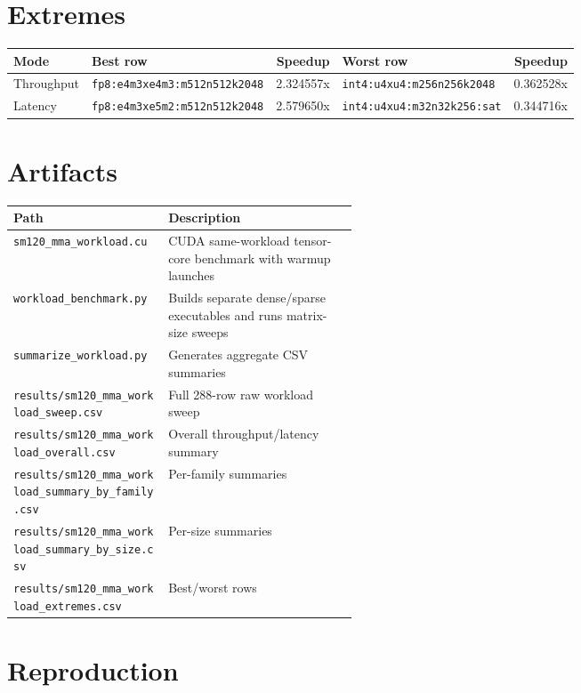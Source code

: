 \documentclass[10pt]{article}
\begin{document}
\section{Extremes}

\begin{center}
\small
\begin{tabularx}{\linewidth}{lY r Y r}
\toprule
Mode & Best row & Speedup & Worst row & Speedup \\
\midrule
Throughput & \texttt{fp8:e4m3xe4m3:m512n512k2048} & 2.324557x & \texttt{int4:u4xu4:m256n256k2048} & 0.362528x \\
Latency & \texttt{fp8:e4m3xe5m2:m512n512k2048} & 2.579650x & \texttt{int4:u4xu4:m32n32k256:sat} & 0.344716x \\
\bottomrule
\end{tabularx}
\end{center}

\section{Artifacts}

\begin{center}
\small
\begin{tabularx}{\linewidth}{L{0.45\linewidth}Y}
\toprule
Path & Description \\
\midrule
\texttt{sm120\_mma\_workload.cu} & CUDA same-workload tensor-core benchmark with warmup launches \\
\texttt{workload\_benchmark.py} & Builds separate dense/sparse executables and runs matrix-size sweeps \\
\texttt{summarize\_workload.py} & Generates aggregate CSV summaries \\
\texttt{results/sm120\_mma\_workload\_sweep.csv} & Full 288-row raw workload sweep \\
\texttt{results/sm120\_mma\_workload\_overall.csv} & Overall throughput/latency summary \\
\texttt{results/sm120\_mma\_workload\_summary\_by\_family.csv} & Per-family summaries \\
\texttt{results/sm120\_mma\_workload\_summary\_by\_size.csv} & Per-size summaries \\
\texttt{results/sm120\_mma\_workload\_extremes.csv} & Best/worst rows \\
\bottomrule
\end{tabularx}
\end{center}

\section{Reproduction}
\end{document}
